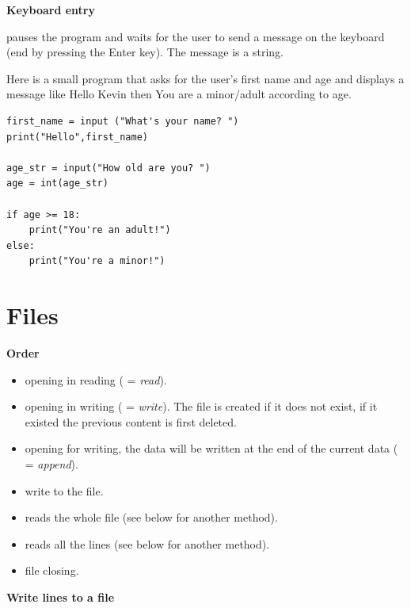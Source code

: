 \documentclass[11pt,class=report,crop=false]{standalone}
\begin{document}
\bigskip

\textbf{Keyboard entry}

 \quad pauses the program and waits for the user to send a message on the keyboard (end by pressing the \og{}Enter\fg{} key). The message is a string.

Here is a small program that asks for the user's first name and age and displays a message like 
\og{}Hello Kevin\fg{} then \og{}You are a minor/adult\fg{} according to age. 
\begin{lstlisting}
first_name = input ("What's your name? ")
print("Hello",first_name)

age_str = input("How old are you? ")
age = int(age_str)

if age >= 18:
    print("You're an adult!")
else:
    print("You're a minor!")
\end{lstlisting}  




\section{Files}

\textbf{Order} 

\begin{itemize}
  \item {} \quad opening in reading ( = \emph{read}).
  \item {} \quad opening in writing ( = \emph{write}). The file is created if it does not exist, if it existed the previous content is first deleted.
  \item {} \quad opening for writing, the data will be written at the end of the current data ( = \emph{append}).
  
  \item {} \quad write to the file.
  \item {} \quad reads the whole file (see below for another method).
  \item {} \quad reads all the lines (see below for another method).
  
  \item {} \quad file closing.
\end{itemize}

\bigskip

\textbf{Write lines to a file} 
\end{document}
